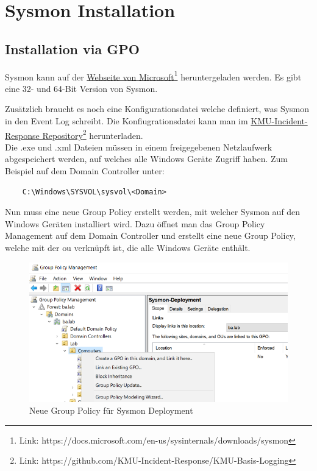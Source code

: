 \chapter{Sysmon Installation}

\section{Installation via GPO}

Sysmon kann auf der \href{https://docs.microsoft.com/en-us/sysinternals/downloads/sysmon}{Webseite von Microsoft}\footnote{Link: https://docs.microsoft.com/en-us/sysinternals/downloads/sysmon} heruntergeladen werden.
Es gibt eine 32- und 64-Bit Version von Sysmon.

Zusätzlich braucht es noch eine Konfigurationsdatei welche definiert, was Sysmon in den Event Log schreibt.
Die Konfiugrationsdatei kann man im \href{https://github.com/KMU-Incident-Response/KMU-Basis-Logging}{KMU-Incident-Response Repository}\footnote{Link: https://github.com/KMU-Incident-Response/KMU-Basis-Logging} herunterladen.\\

Die .exe und .xml Dateien müssen in einem freigegebenen Netzlaufwerk abgespeichert werden, auf welches alle Windows Geräte Zugriff haben. Zum Beispiel auf dem Domain Controller unter:
\begin{lstlisting}
    C:\Windows\SYSVOL\sysvol\<Domain>
\end{lstlisting}

Nun muss eine neue Group Policy erstellt werden, mit welcher Sysmon auf den Windows Geräten installiert wird.
Dazu öffnet man das Group Policy Management auf dem Domain Controller und erstellt eine neue Group Policy, welche mit der \acrshort{ou} verknüpft ist, die alle Windows Geräte enthält.
\begin{figure}[H]
    \centering
    \includegraphics[width=0.7\linewidth]{../img/agent/create-new-group-policy.png}
    \caption{Neue Group Policy für Sysmon Deployment}
\end{figure}

